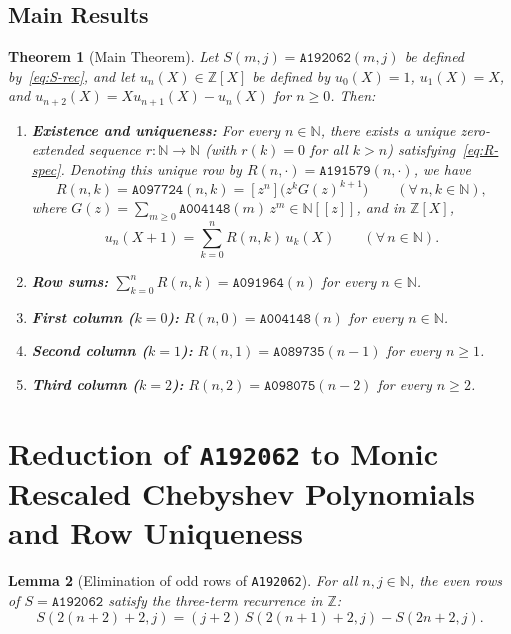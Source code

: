 \documentclass[11pt]{article}
\newcommand{\llbracket}{[\![}
\newcommand{\rrbracket}{]\!]}
\newtheorem{theorem}{Theorem}[section]
\newtheorem{lemma}[theorem]{Lemma}
\theoremstyle{definition}
\newcommand{\N}{\mathbb{N}}
\newcommand{\Z}{\mathbb{Z}}
\newcommand{\seq}[1]{\texttt{#1}}
\begin{document}
\subsection{Main Results}

\begin{theorem}[Main Theorem]
\label{thm:main}
Let $S(m, j) = \seq{A192062}(m, j)$ be defined by~\eqref{eq:S-rec}, and let $u_n(X) \in \Z[X]$ be defined by $u_0(X) = 1$, $u_1(X) = X$, and $u_{n+2}(X) = X u_{n+1}(X) - u_n(X)$ for $n \ge 0$. Then:
\begin{enumerate}
\item[\textup{(0)}] \textbf{Existence and uniqueness:} For every $n \in \N$, there exists a unique zero-extended sequence $r : \N \to \N$ (with $r(k) = 0$ for all $k > n$) satisfying~\eqref{eq:R-spec}. Denoting this unique row by $R(n, \cdot) = \seq{A191579}(n, \cdot)$, we have
\[
R(n, k) = \seq{A097724}(n, k) = [z^n]\bigl(z^k G(z)^{k+1}\bigr) \qquad (\forall\, n, k \in \N),
\]
where $G(z) = \sum_{m \ge 0} \seq{A004148}(m)\,z^m \in \N\llbracket z \rrbracket$, and in $\Z[X]$,
\[
u_n(X + 1) = \sum_{k=0}^{n} R(n, k)\,u_k(X) \qquad (\forall\, n \in \N).
\]
\item[\textup{(1)}] \textbf{Row sums:} $\sum_{k=0}^{n} R(n, k) = \seq{A091964}(n)$ for every $n \in \N$.
\item[\textup{(2)}] \textbf{First column ($k = 0$):} $R(n, 0) = \seq{A004148}(n)$ for every $n \in \N$.
\item[\textup{(3)}] \textbf{Second column ($k = 1$):} $R(n, 1) = \seq{A089735}(n - 1)$ for every $n \ge 1$.
\item[\textup{(4)}] \textbf{Third column ($k = 2$):} $R(n, 2) = \seq{A098075}(n - 2)$ for every $n \ge 2$.
\end{enumerate}
\end{theorem}

\section{Reduction of \seq{A192062} to Monic Rescaled Chebyshev Polynomials and Row Uniqueness}

\begin{lemma}[Elimination of odd rows of \seq{A192062}]
\label{lem:S-even-rec}
For all $n, j \in \N$, the even rows of $S = \seq{A192062}$ satisfy the three-term recurrence in $\Z$:
\begin{equation}
\label{eq:S-even-rec}
S(2(n+2)+2, j) = (j + 2)\,S(2(n+1)+2, j) - S(2n+2, j).
\end{equation}
\end{lemma}
\end{document}
